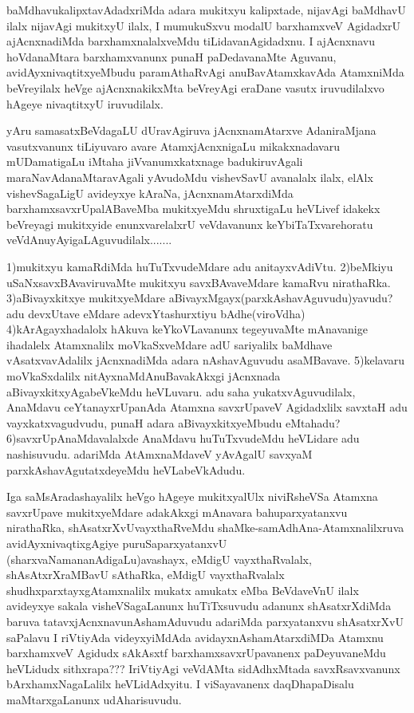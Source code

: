 \begin{artha}
baMdhavukalipxtavAdadxriMda adara mukitxyu kalipxtade, nijavAgi baMdhavU ilalx nijavAgi mukitxyU ilalx, I mumukuSxvu modalU barxhamxveV AgidadxrU ajAcnxnadiMda barxhamxnalalxveMdu tiLidavanAgidadxnu. I ajAcnxnavu hoVdanaMtara barxhamxvanunx punaH paDedavanaMte Aguvanu, avidAyxnivaqtitxyeMbudu paramAthaRvAgi anuBavAtamxkavAda AtamxniMda beVreyilalx heVge ajAcnxnakikxMta beVreyAgi eraDane vasutx iruvudilalxvo hAgeye nivaqtitxyU iruvudilalx.
\end{artha}

\begin{artha}
yAru samasatxBeVdagaLU dUravAgiruva jAcnxnamAtarxve AdaniraMjana vasutxvanunx tiLiyuvaro avare AtamxjAcnxnigaLu mikakxnadavaru mUDamatigaLu iMtaha jiVvanumxkatxnage badukiruvAgali maraNavAdanaMtaravAgali yAvudoMdu vishevSavU avanalalx ilalx, elAlx vishevSagaLigU avideyxye kAraNa, jAcnxnamAtarxdiMda barxhamxsavxrUpalABaveMba mukitxyeMdu shruxtigaLu heVLivef idakekx beVreyagi mukitxyide enunxvarelalxrU veVdavanunx keYbiTaTxvarehoratu veVdAnuyAyigaLAguvudilalx.......
\end{artha}

\begin{artha}
1)mukitxyu kamaRdiMda huTuTxvudeMdare adu anitayxvAdiVtu.
2)beMkiyu uSaNxsavxBAvaviruvaMte mukitxyu savxBAvaveMdare kamaRvu nirathaRka.
3)aBivayxkitxye mukitxyeMdare aBivayxMgayx(parxkAshavAguvudu)yavudu? adu devxUtave eMdare adevxYtashurxtiyu bAdhe(viroVdha)
4)kArAgayxhadalolx hAkuva keYkoVLavanunx tegeyuvaMte mAnavanige ihadalelx Atamxnalilx moVkaSxveMdare adU sariyalilx baMdhave vAsatxvavAdalilx jAcnxnadiMda adara nAshavAguvudu asaMBavave.
5)kelavaru moVkaSxdalilx nitAyxnaMdAnuBavakAkxgi jAcnxnada aBivayxkitxyAgabeVkeMdu heVLuvaru. adu saha yukatxvAguvudilalx, AnaMdavu ceYtanayxrUpanAda Atamxna savxrUpaveV Agidadxlilx savxtaH adu vayxkatxvagudvudu, punaH adara aBivayxkitxyeMbudu eMtahadu?
6)savxrUpAnaMdavalalxde AnaMdavu huTuTxvudeMdu heVLidare adu nashisuvudu. adariMda AtAmxnaMdaveV yAvAgalU savxyaM parxkAshavAgutatxdeyeMdu heVLabeVkAdudu.
\end{artha}

\begin{artha}
Iga saMsAradashayalilx heVgo hAgeye mukitxyalUlx niviRsheVSa Atamxna savxrUpave mukitxyeMdare adakAkxgi mAnavara bahuparxyatanxvu nirathaRka, shAsatxrXvUvayxthaRveMdu shaMke-samAdhAna-Atamxnalilxruva avidAyxnivaqtixgAgiye puruSaparxyatanxvU (sharxvaNamananAdigaLu)avashayx, eMdigU vayxthaRvalalx, shAsAtxrXraMBavU sAthaRka, eMdigU vayxthaRvalalx shudhxparxtayxgAtamxnalilx mukatx amukatx eMba BeVdaveVnU ilalx avideyxye sakala visheVSagaLanunx huTiTxsuvudu adanunx shAsatxrXdiMda baruva tatavxjAcnxnavunAshamAduvudu adariMda parxyatanxvu shAsatxrXvU saPalavu I riVtiyAda videyxyiMdAda avidayxnAshamAtarxdiMDa Atamxnu barxhamxveV Agidudx sAkAsxtf barxhamxsavxrUpavanenx paDeyuvaneMdu heVLidudx sithxrapa??? IriVtiyAgi veVdAMta sidAdhxMtada savxRsavxvanunx bArxhamxNagaLalilx heVLidAdxyitu. I viSayavanenx daqDhapaDisalu maMtarxgaLanunx udAharisuvudu.
\end{artha}

